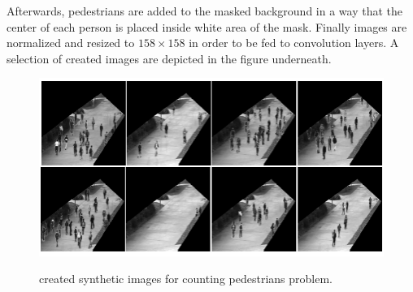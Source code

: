 \begin{enumerate}
Afterwards, pedestrians are added to the masked background in a way that the center of each person is placed inside white area of the mask. Finally images are normalized and resized to $158\times158$ in order to be fed to convolution layers. A selection of created images are depicted in the figure underneath.

\begin{figure}[H]
	\centering
	{\includegraphics[width=1\textwidth]{images/myped}}
	\caption{created synthetic images for counting pedestrians problem.}
	\label{fig:myped}
\end{figure}

\end{enumerate}


